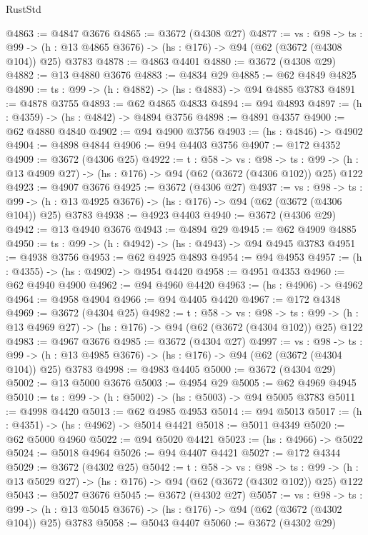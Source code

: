 \begin{lexlean}{RustStd}
\begin{coremodule}
@4863 := @4847 @3676
@4865 := @3672 (@4308 @27)
@4877 := {vs : @98} ->
  {ts : @99} -> (h : @13 @4865 @3676) -> (hs : @176) -> @94 (@62 (@3672 (@4308 @104)) @25) @3783
@4878 := @4863 @4401
@4880 := @3672 (@4308 @29)
@4882 := @13 @4880 @3676
@4883 := @4834 @29
@4885 := @62 @4849 @4825
@4890 := {ts : @99} -> (h : @4882) -> (hs : @4883) -> @94 @4885 @3783
@4891 := @4878 @3755
@4893 := @62 @4865 @4833
@4894 := @94 @4893
@4897 := (h : @4359) -> (hs : @4842) -> @4894 @3756
@4898 := @4891 @4357
@4900 := @62 @4880 @4840
@4902 := @94 @4900 @3756
@4903 := (hs : @4846) -> @4902
@4904 := @4898 @4844
@4906 := @94 @4403 @3756
@4907 := @172 @4352
@4909 := @3672 (@4306 @25)
@4922 := {t : @58} ->
  {vs : @98} ->
  {ts : @99} -> (h : @13 @4909 @27) -> (hs : @176) -> @94 (@62 (@3672 (@4306 @102)) @25) @122
@4923 := @4907 @3676
@4925 := @3672 (@4306 @27)
@4937 := {vs : @98} ->
  {ts : @99} -> (h : @13 @4925 @3676) -> (hs : @176) -> @94 (@62 (@3672 (@4306 @104)) @25) @3783
@4938 := @4923 @4403
@4940 := @3672 (@4306 @29)
@4942 := @13 @4940 @3676
@4943 := @4894 @29
@4945 := @62 @4909 @4885
@4950 := {ts : @99} -> (h : @4942) -> (hs : @4943) -> @94 @4945 @3783
@4951 := @4938 @3756
@4953 := @62 @4925 @4893
@4954 := @94 @4953
@4957 := (h : @4355) -> (hs : @4902) -> @4954 @4420
@4958 := @4951 @4353
@4960 := @62 @4940 @4900
@4962 := @94 @4960 @4420
@4963 := (hs : @4906) -> @4962
@4964 := @4958 @4904
@4966 := @94 @4405 @4420
@4967 := @172 @4348
@4969 := @3672 (@4304 @25)
@4982 := {t : @58} ->
  {vs : @98} ->
  {ts : @99} -> (h : @13 @4969 @27) -> (hs : @176) -> @94 (@62 (@3672 (@4304 @102)) @25) @122
@4983 := @4967 @3676
@4985 := @3672 (@4304 @27)
@4997 := {vs : @98} ->
  {ts : @99} -> (h : @13 @4985 @3676) -> (hs : @176) -> @94 (@62 (@3672 (@4304 @104)) @25) @3783
@4998 := @4983 @4405
@5000 := @3672 (@4304 @29)
@5002 := @13 @5000 @3676
@5003 := @4954 @29
@5005 := @62 @4969 @4945
@5010 := {ts : @99} -> (h : @5002) -> (hs : @5003) -> @94 @5005 @3783
@5011 := @4998 @4420
@5013 := @62 @4985 @4953
@5014 := @94 @5013
@5017 := (h : @4351) -> (hs : @4962) -> @5014 @4421
@5018 := @5011 @4349
@5020 := @62 @5000 @4960
@5022 := @94 @5020 @4421
@5023 := (hs : @4966) -> @5022
@5024 := @5018 @4964
@5026 := @94 @4407 @4421
@5027 := @172 @4344
@5029 := @3672 (@4302 @25)
@5042 := {t : @58} ->
  {vs : @98} ->
  {ts : @99} -> (h : @13 @5029 @27) -> (hs : @176) -> @94 (@62 (@3672 (@4302 @102)) @25) @122
@5043 := @5027 @3676
@5045 := @3672 (@4302 @27)
@5057 := {vs : @98} ->
  {ts : @99} -> (h : @13 @5045 @3676) -> (hs : @176) -> @94 (@62 (@3672 (@4302 @104)) @25) @3783
@5058 := @5043 @4407
@5060 := @3672 (@4302 @29)

\end{coremodule}
\end{lexlean}
